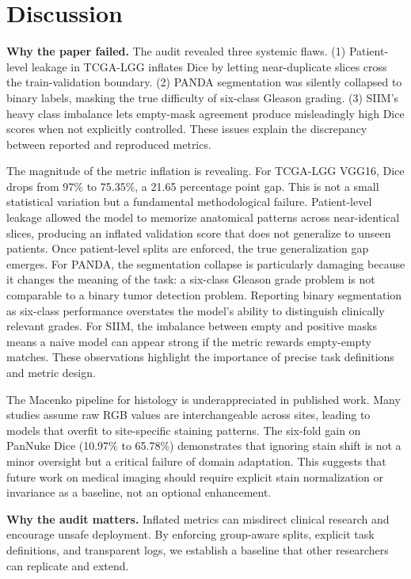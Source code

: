 \documentclass[conference,a4paper]{IEEEtran}
\begin{document}
\section{Discussion}
\textbf{Why the paper failed.} The audit revealed three systemic flaws. (1) Patient-level leakage in TCGA-LGG inflates Dice by letting near-duplicate slices cross the train-validation boundary. (2) PANDA segmentation was silently collapsed to binary labels, masking the true difficulty of six-class Gleason grading. (3) SIIM's heavy class imbalance lets empty-mask agreement produce misleadingly high Dice scores when not explicitly controlled. These issues explain the discrepancy between reported and reproduced metrics.
\par
The magnitude of the metric inflation is revealing. For TCGA-LGG VGG16, Dice drops from 97\% to 75.35\%, a 21.65 percentage point gap. This is not a small statistical variation but a fundamental methodological failure. Patient-level leakage allowed the model to memorize anatomical patterns across near-identical slices, producing an inflated validation score that does not generalize to unseen patients. Once patient-level splits are enforced, the true generalization gap emerges.
For PANDA, the segmentation collapse is particularly damaging because it changes the meaning of the task: a six-class Gleason grade problem is not comparable to a binary tumor detection problem. Reporting binary segmentation as six-class performance overstates the model's ability to distinguish clinically relevant grades. For SIIM, the imbalance between empty and positive masks means a naive model can appear strong if the metric rewards empty-empty matches. These observations highlight the importance of precise task definitions and metric design.
\par
The Macenko pipeline for histology is underappreciated in published work. Many studies assume raw RGB values are interchangeable across sites, leading to models that overfit to site-specific staining patterns. The six-fold gain on PanNuke Dice (10.97\% to 65.78\%) demonstrates that ignoring stain shift is not a minor oversight but a critical failure of domain adaptation. This suggests that future work on medical imaging should require explicit stain normalization or invariance as a baseline, not an optional enhancement.

\textbf{Why the audit matters.} Inflated metrics can misdirect clinical research and encourage unsafe deployment. By enforcing group-aware splits, explicit task definitions, and transparent logs, we establish a baseline that other researchers can replicate and extend.
\end{document}
